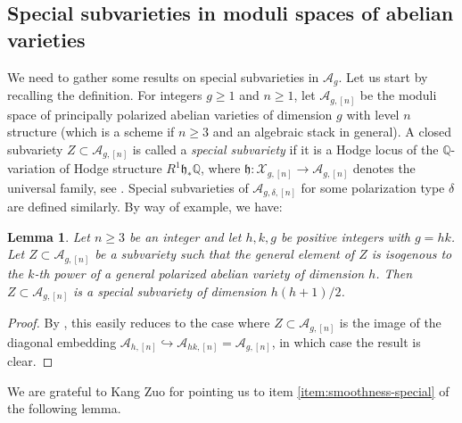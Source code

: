 \documentclass[a4paper,11pt,reqno]{amsart}
\numberwithin{equation}{section}
\theoremstyle{plain}
\newtheorem{lemma}[theorem]{Lemma}
\theoremstyle{definition}
\newcommand{\Q}{\mathbb Q}
\newcommand{\mf}[1]{{\mathfrak{#1}}}
\newcommand{\ca}[1]{{\mathcal{#1}}}
\begin{document}
\subsection{Special subvarieties in moduli spaces of abelian varieties}\label{section:specialsub} 
We need to gather some results on special subvarieties in $\ca A_g$. Let us start by recalling the definition. 
For integers $g \geq 1$ and $n \geq 1$, let $\ca A_{g,[n]}$ be the moduli space of principally polarized abelian varieties of dimension $g$ with level $n$ structure (which is a scheme if $n \geq 3$ and an algebraic stack in general).  
A closed subvariety $Z \subset \ca A_{g,[n]}$ is called a \emph{special subvariety} if it is a Hodge locus of the $\Q$-variation of Hodge structure $R^1\mf h_\ast\Q$, where $\mf h \colon \ca X_{g,[n]} \to \ca A_{g,[n]}$ denotes the universal family, see \cite[Definition 3.7]{moonenoort-specialsubvarieties}.
Special subvarieties of $\ca A_{g,\delta,[n]}$ for some polarization type $\delta$ are defined similarly. 
By way of example, we have:
\begin{lemma} \label{lemma:special-lemma}
Let $n \geq 3$ be an integer and let $h, k, g$ be positive integers with $g = hk$. Let $Z \subset \ca A_{g,[n]}$ be a subvariety such that the general element of $Z$ is isogenous to the $k$-th power of a general polarized abelian variety of dimension $h$. Then $Z \subset \ca A_{g,[n]}$ is a special subvariety of dimension $h(h+1)/2$.
\end{lemma}
\begin{proof} 
By \cite[Remark 3.13]{moonenoort-specialsubvarieties}, this easily reduces to the case where $Z \subset \ca A_{g,[n]}$ is the image of the diagonal embedding $\ca A_{h,[n]} \hookrightarrow \ca A_{hk,[n]} = \ca A_{g,[n]}$, in which case the result is clear.  
\end{proof}

We are grateful to Kang Zuo for pointing us to item \eqref{item:smoothness-special} of the following lemma.
\end{document}
